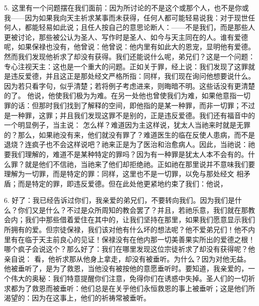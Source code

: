 5. 这里有一个问题摆在我们面前：因为所讨论的不是这个或那个人，也不是你或我——因为如果我向天主祈求某事而未获得，任何人都可能轻易说我：对于现世任何人，都能轻易如此说；且任人按自己的意思论断人：——不是我们，而是那些人更被讨论，那些被公认为圣人、写作时是圣人、如今与天主同在的人。谁有爱德呢，如果保禄也没有，他曾说：他曾说：他内里有如此大的恩宠，显明他有爱德。然而我们发现他祈求了却没有获得。我们还能说什么呢，弟兄们？这是一个问题：专心注视天主：这也是一个重大的问题。正如关于罪，经上说：我们发现了这罪就是违反爱德，并且这正是那处经文严格所指：同样，我们现在询问他想要说什么。因为若只看字句，似乎清楚；若将例子考虑进来，则晦暗不明。这些话没有更清楚的了。 他说，他使我们极为为难。在另一处他也曾使我们为难，如果他意指一切罪的话：但那时我们找到了解释的空间，即他指的是某一种罪，而非一切罪；不过是一种罪，这罪；并且我们发现这罪不是别的，正是违反爱德。我们还有福音中的一个明显例子，当主说：  怎么样？难道因为主这样说，犹太人当祂来时就是无罪的？那么，如果祂没有来，他们就没有罪了？难道医生的临在反使人患病，而不是退烧？连疯子也不会这样说吧？祂来正是为了医治和治愈病人。因此，当祂说：祂要我们理解的，难道不是某种特定的罪吗？因为有一种罪是犹太人本不会有的。什么罪？就是他们不信祂，当祂来了他们却拒绝祂。正如祂在那里说并不意味我们要理解为一切罪，而是特定的罪：同样，这里也不是一切罪，以免与那处经文  相矛盾；而是特定的罪，即违反爱德。但在此处他更紧地约束了我们：他说， \par

6. 好了：我已经告诉过你们，我亲爱的弟兄们，不要转向我们。因为我们是什么？你们又是什么？不过是众所周知的教会罢了？并且，若祂乐意，我们就在那教会内；我们中那些借着爱住在其中的，让我们坚持在那里，如果我们愿意显示我们所拥有的爱。但宗徒保禄，我们该对他有什么坏的想法呢？他不爱弟兄们！他不内里有在临于天主前良心的见证！保禄没有在他内那一切美善果实所出的爱德之根！哪个疯子会说这个？那么好了：我们在哪里发现这位宗徒祈求了却没有获得呢？他亲自说：  看，他祈求那从他身上拿走，却没有被垂听。为什么？因为对他无益。他被垂听了，是为了救恩，当他没有被按他的意愿垂听时。要知道，我亲爱的，一个伟大的奥秘：我们特意提醒你们注意，免得你们在诱惑中失掉。圣人们的一切祈求都为了救恩而被垂听：他们总是在关乎他们永恒救恩的事上被垂听；这是他们所渴望的：因为在这事上，他们的祈祷常被垂听。\par

